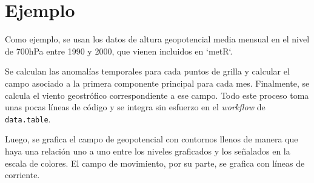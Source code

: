 \documentclass[runningheads]{llncs}
\begin{document}
\section{Ejemplo}

Como ejemplo, se usan los datos de altura geopotencial media mensual en el nivel de 700hPa entre 1990 y 2000, que vienen incluidos en `metR`. 

Se calculan las anomalías temporales para cada puntos de grilla y calcular el campo asociado a la primera componente principal para cada mes. Finalmente, se calcula el viento geostrófico correspondiente a ese campo. Todo este proceso toma unas pocas líneas de código y se integra sin esfuerzo en el \emph{workflow} de \texttt{data.table}. 

\begin{Schunk}
\end{Schunk}


Luego, se grafica el campo de geopotencial con contornos llenos de manera que haya una relación uno a uno entre los niveles graficados y los señalados en la escala de colores. El campo de movimiento, por su parte, se grafica con líneas de corriente. 
\end{document}
